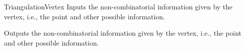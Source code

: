 \begin{ccRefConcept}{TriangulationVertex}
%
{Inputs the non-combinatorial information given by the vertex, {i.e.},
the point and other possible information.}

%
{Outputs the non-combinatorial information given by the vertex, {i.e.},
the point and other possible information.}

\ccSeeAlso

\\
\\

\end{ccRefConcept}
